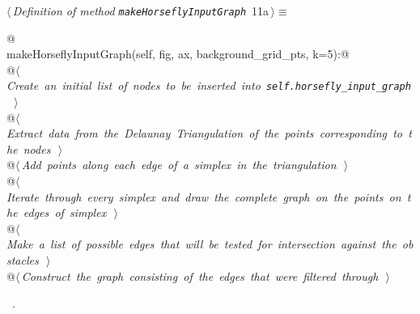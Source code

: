 \documentclass[11.5pt]{report}
\begin{document}
\begin{flushleft} \small
\begin{minipage}{\linewidth}\label{scrap11}\raggedright\small
{} $\langle\,${\itshape Definition of method \verb|makeHorseflyInputGraph|}\nobreak\ {\footnotesize {11a}}$\,\rangle\equiv$
\vspace{-1ex}
\begin{list}{}{} \item
\mbox{}\verb@   @\\
\mbox{}\verb@def makeHorseflyInputGraph(self, fig, ax, background_grid_pts, k=5):@\\
\mbox{}\verb@    @\hbox{$\langle\,${\itshape Create an initial list of nodes to be inserted into \verb|self.horsefly_input_graph|}\nobreak\ {\footnotesize {}}$\,\rangle$}\verb@@\\
\mbox{}\verb@    @\hbox{$\langle\,${\itshape Extract data from the Delaunay Triangulation of the points corresponding to the nodes}\nobreak\ {\footnotesize {}}$\,\rangle$}\verb@@\\
\mbox{}\verb@    @\hbox{$\langle\,${\itshape Add points along each edge of a simplex in the triangulation}\nobreak\ {\footnotesize {}}$\,\rangle$}\verb@@\\
\mbox{}\verb@    @\hbox{$\langle\,${\itshape Iterate through every simplex and draw the complete graph on the points on the edges of simplex}\nobreak\ {\footnotesize {}}$\,\rangle$}\verb@@\\
\mbox{}\verb@    @\hbox{$\langle\,${\itshape Make a list of possible edges that will be tested for intersection against the obstacles}\nobreak\ {\footnotesize {}}$\,\rangle$}\verb@@\\
\mbox{}\verb@    @\hbox{$\langle\,${\itshape Construct the graph consisting of the edges that were filtered through}\nobreak\ {\footnotesize {}}$\,\rangle$}\verb@@\\
\mbox{}\verb@@{\NWsep}
\end{list}
\vspace{-1.5ex}
\footnotesize
\begin{list}{}{\setlength{\itemsep}{-\parsep}\setlength{\itemindent}{-\leftmargin}}
\item \NWtxtMacroRefIn\ .

\item{}
\end{list}
\end{minipage}\vspace{4ex}
\end{flushleft}
\end{document}
